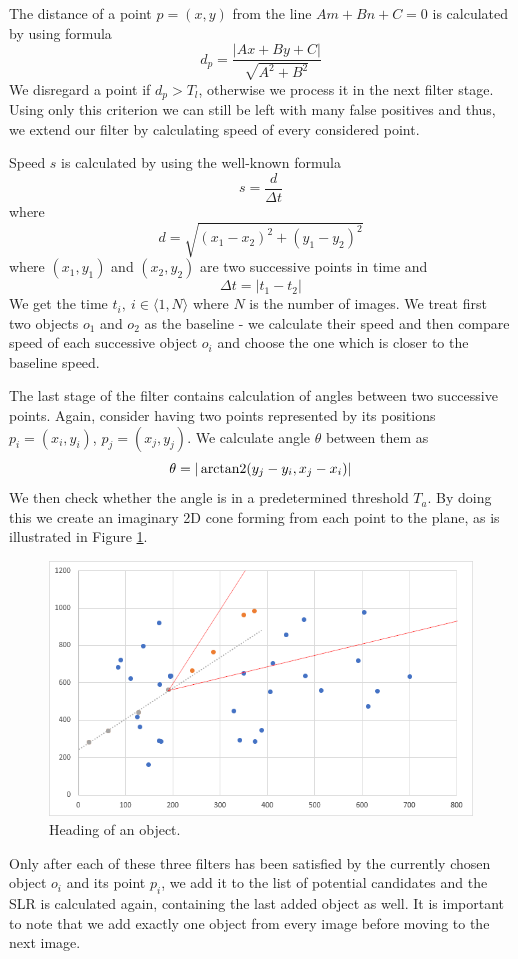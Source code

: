 	The distance of a point $p=(x,y)$ from the line $Am+Bn+C=0$ is calculated by using formula $$d_p=\frac{|Ax+By+C|}{\sqrt{A^2+B^2}}$$ We disregard a point if $d_p>T_l$, otherwise we process it in the next filter stage. Using only this criterion we can still be left with many false positives and thus, we extend our filter by calculating speed of every considered point. 
	
	Speed $s$ is calculated by using the well-known formula $$s=\frac{d}{{\Delta}t}$$ where $$d=\sqrt{(x_1-x_2)^2 + (y_1-y_2)^2}$$ where $(x_1,y_1)$ and $(x_2,y_2)$ are two successive points in time and $${\Delta}t=|t_1-t_2|$$ We get the time $t_{i},\ i\in\langle1,N\rangle$ where $N$ is the number of images. We treat first two objects $o_1$ and $o_2$ as the baseline - we calculate their speed and then compare speed of each successive object $o_i$ and choose the one which is closer to the baseline speed.
	
	The last stage of the filter contains calculation of angles between two successive points. Again, consider having two points represented by its positions $p_{i}=(x_i,y_i)$, $p_j=(x_j,y_j)$. We calculate angle $\theta$ between them as $$\theta=|\operatorname{arctan2}(y_j-y_i, x_j-x_i)|$$ We then check whether the angle is in a predetermined threshold $T_a$. By doing this we create an imaginary 2D cone forming from each point to the plane, as is illustrated in Figure \ref{fig:regresia2}.
	
	\begin{figure}[H]
	\centering
	  \includegraphics[width=12cm]{images/regresia2}
		  \caption{Heading of an object.}
	  \label{fig:regresia2}
	\end{figure}
	
	Only after each of these three filters has been satisfied by the currently chosen object $o_i$ and its point $p_i$, we add it to the list of potential candidates and the SLR is calculated again, containing the last added object as well. It is important to note that we add exactly one object from every image before moving to the next image.
	
